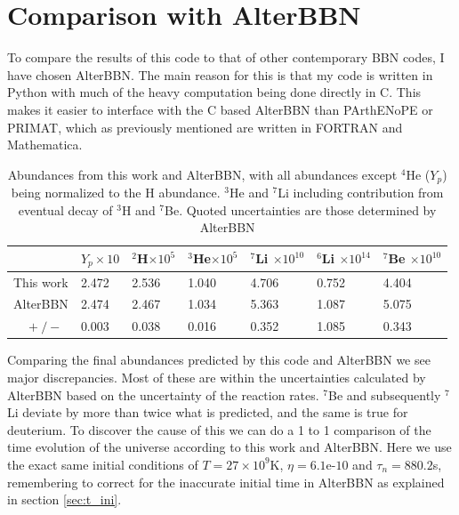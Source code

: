 \section{Comparison with AlterBBN}
\label{sec:Altercompare}
To compare the results of this code to that of other contemporary BBN codes, I have chosen AlterBBN. The main reason for this is that my code is written in Python with much of the heavy computation being done directly in C. This makes it easier to interface with the C based AlterBBN than PArthENoPE or PRIMAT, which as previously mentioned are written in FORTRAN and Mathematica. 
\begin{table}[ht]
    \begin{tabular}{l|llllll}
        & $Y_p \times 10$ & \hspace{-0.34em}$^{2}$H$ \times 10^{5}$ & \hspace{-0.34em}$^{3}$He$ \times 10^{5}$ & \hspace{-0.34em}$^{7}$Li $ \times 10^{10}$& \hspace{-0.34em}$^{6}$Li $ \times 10^{14}$& \hspace{-0.34em}$^{7}$Be $ \times 10^{10}$\\ \hline
    This work & 2.472            & 2.536 & 1.040 & 4.706 & 0.752 & 4.404   \\ \hline
    AlterBBN & 2.474            & 2.467 & 1.034 & 5.363 & 1.087 & 5.075   \\ %
    $\quad +/-$ & 0.003           & 0.038 & 0.016 & 0.352 & 1.085 & 0.343      
    \end{tabular}
    \caption{Abundances from this work and AlterBBN, with all abundances except ${}^4$He ($Y_p$) being normalized to the H abundance. ${}^3$He and ${}^7$Li including contribution from eventual decay of ${}^3$H and ${}^7$Be. Quoted uncertainties are those determined by AlterBBN}
    \label{tab:shortAlterabun}
\end{table}


Comparing the final abundances predicted by this code and AlterBBN we see major discrepancies. Most of these are within the uncertainties calculated by AlterBBN based on the uncertainty of the reaction rates. ${}^7$Be and subsequently ${}^7$Li deviate by more than twice what is predicted, and the same is true for deuterium. To discover the cause of this we can do a 1 to 1 comparison of the time evolution of the universe according to this work and AlterBBN. Here we use the exact same initial conditions of $T=27\times10^9$K, $\eta=6.1$e-$10$ and $\tau_n=880.2$s, remembering to correct for the inaccurate initial time in AlterBBN as explained in section \ref{sec:t_ini}.

